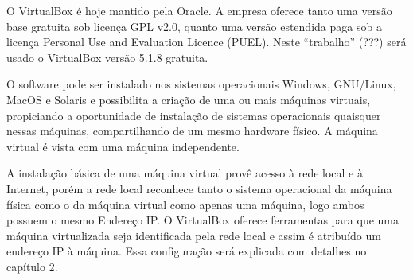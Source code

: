 	O VirtualBox é hoje mantido pela Oracle. A empresa oferece tanto uma versão base gratuita sob licença GPL v2.0, quanto uma versão estendida paga sob a licença Personal Use and Evaluation Licence (PUEL). Neste “trabalho” (???) será usado o VirtualBox versão 5.1.8 gratuita.
	
	O software pode ser instalado nos sistemas operacionais Windows, GNU/Linux, MacOS e Solaris e possibilita a criação de uma ou mais máquinas virtuais, propiciando a oportunidade de instalação de sistemas operacionais quaisquer nessas máquinas, compartilhando de um mesmo hardware físico. A máquina virtual é vista com uma máquina independente.
	
	A instalação básica de uma máquina virtual provê acesso à rede local e à Internet, porém a rede local reconhece tanto o sistema operacional da máquina física como o da máquina virtual como apenas uma máquina, logo ambos possuem o mesmo Endereço IP. O VirtualBox oferece ferramentas para que uma máquina virtualizada seja identificada pela rede local e assim é atribuído um endereço IP à máquina. Essa configuração será explicada com detalhes no capítulo 2.
	
	 